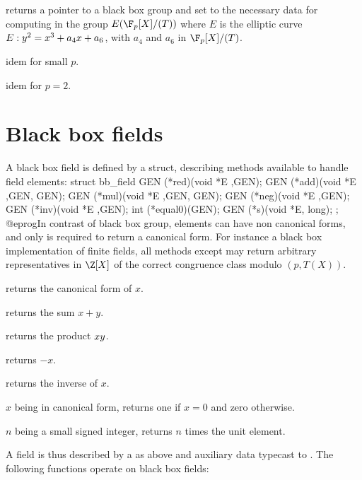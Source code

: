 returns a pointer to a black box group and set  to the necessary data for
computing in the group $E(\F_p[X]/(T))$ where $E$ is the elliptic curve $E:y^2=x^3+a_4\*x+a_6$,
with $a_4$ and $a_6$ in $\F_p[X]/(T)$.

 idem for small $p$.

idem for $p=2$.

\section{Black box fields}

A black box field is defined by a  struct, describing methods
available to handle field elements:
\bprog
  struct bb_field
  {
    GEN (*red)(void *E ,GEN);
    GEN (*add)(void *E ,GEN, GEN);
    GEN (*mul)(void *E ,GEN, GEN);
    GEN (*neg)(void *E ,GEN);
    GEN (*inv)(void *E ,GEN);
    int (*equal0)(GEN);
    GEN (*s)(void *E, long);
  };
@eprog\noindent In contrast of black box group, elements can have
non canonical forms, and only  is required to return a canonical form.
For instance a black box implementation of finite fields, all methods
except  may return arbitrary representatives in $\Z[X]$ of the
correct congruence class modulo $(p,T(X))$.

 returns the canonical form of $x$.

 returns the sum $x+y$.

 returns the product $x\*y$.

 returns $-x$.

 returns the inverse of $x$.

 $x$ being in canonical form, returns one if $x=0$ and zero
otherwise.

 $n$ being a small signed integer, returns $n$ times the unit element.

\noindent A field is thus described by a  as above and
auxiliary data typecast to . The following functions operate on
black box fields:



